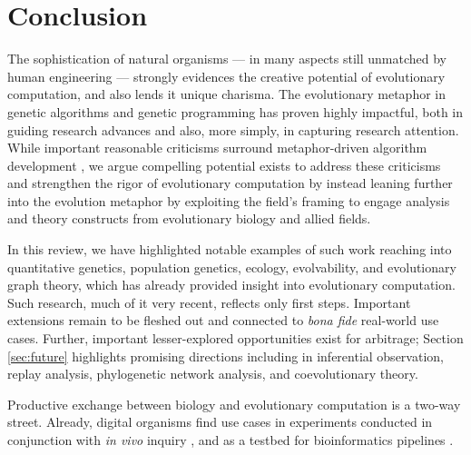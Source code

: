 
\section{Conclusion} \label{sec:conclusion}

The sophistication of natural organisms --- in many aspects still unmatched by human engineering --- strongly evidences the creative potential of evolutionary computation, and also lends it unique charisma.
The evolutionary metaphor in genetic algorithms and genetic programming has proven highly impactful, both in guiding research advances and also, more simply, in capturing research attention.
While important reasonable criticisms surround metaphor-driven algorithm development \citep{moore2023evolution,sorensen2013metaheuristics}, we argue compelling potential exists to address these criticisms and strengthen the rigor of evolutionary computation by instead leaning further into the evolution metaphor by exploiting the field's framing to engage analysis and theory constructs from evolutionary biology and allied fields.

In this review, we have highlighted notable examples of such work reaching into quantitative genetics, population genetics, ecology, evolvability, and evolutionary graph theory, which has already provided insight into evolutionary computation.
Such research, much of it very recent, reflects only first steps.
Important extensions remain to be fleshed out and connected to \textit{bona fide} real-world use cases.
Further, important lesser-explored opportunities exist for arbitrage;
Section \ref{sec:future} highlights promising directions including in inferential observation, replay analysis, phylogenetic network analysis, and coevolutionary theory.

Productive exchange between biology and evolutionary computation is a two-way street.
Already, digital organisms find use cases in experiments conducted in conjunction with \textit{in vivo} inquiry \citep{sanjun2007selection,wilke2001evolution,hindr2012new}, and as a testbed for bioinformatics pipelines \citep{daudey2024aevol,haller2023slim,moreno2025extending,TODO}.

